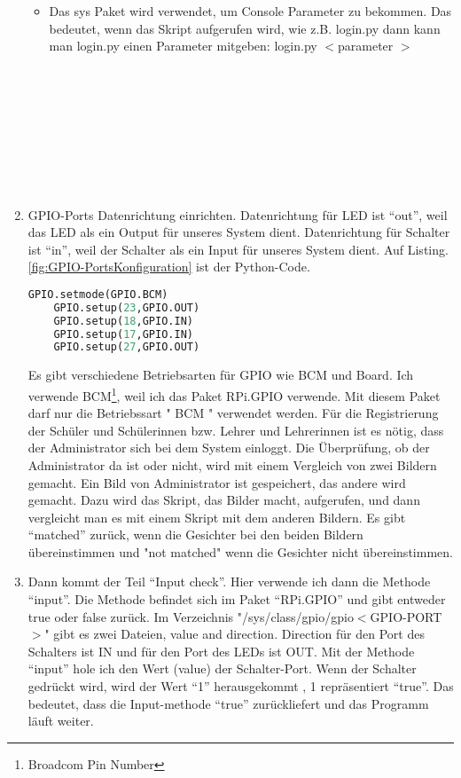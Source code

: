 \begin{enumerate}
\begin{itemize}
	 \item Das sys Paket wird verwendet, um Console Parameter zu bekommen. Das bedeutet, wenn das Skript aufgerufen wird, wie z.B. login.py dann kann man login.py einen Parameter mitgeben:  login.py $<$parameter $>$ \\ \\ \\ \\ \\ \\ \\ \\ \\ 
   \end{itemize}
	\item GPIO-Ports Datenrichtung einrichten. Datenrichtung f\"ur LED ist ``out'', weil das LED als ein Output f\"ur unseres System dient. Datenrichtung f\"ur Schalter ist ``in'', weil der Schalter als ein Input f\"ur unseres System dient. Auf Listing. \ref{fig:GPIO-PortsKonfiguration} ist der Python-Code.
	\begin{lstlisting}[caption={GPIO-Ports Konfiguration},label={fig:GPIO-PortsKonfiguration},language=Python]
	GPIO.setmode(GPIO.BCM)
	GPIO.setup(23,GPIO.OUT)
	GPIO.setup(18,GPIO.IN)
	GPIO.setup(17,GPIO.IN)
	GPIO.setup(27,GPIO.OUT)
	\end{lstlisting}
	Es gibt verschiedene Betriebsarten f\"ur GPIO wie BCM und Board.
	Ich verwende BCM\footnote{Broadcom Pin Number}, weil ich das Paket RPi.GPIO verwende. Mit diesem Paket darf nur die Betriebssart " BCM " verwendet werden. 
	\cite{gpiomode}
	F\"ur die Registrierung der Sch\"uler und Sch\"ulerinnen bzw. Lehrer und Lehrerinnen ist es n\"otig, dass der Administrator sich bei dem System einloggt. Die \"Uberpr\"ufung, ob der Administrator da ist oder nicht,  wird mit einem Vergleich von zwei Bildern gemacht. Ein Bild von Administrator ist gespeichert, das andere wird gemacht. Dazu wird das Skript, das Bilder macht, aufgerufen, und dann vergleicht man es mit einem Skript mit dem anderen Bildern. Es gibt ``matched'' zur\"uck, wenn die Gesichter bei den beiden Bildern \"ubereinstimmen und "not matched" wenn die Gesichter nicht \"ubereinstimmen.
	\item Dann kommt der Teil ``Input check''. 
	Hier verwende ich dann die Methode ``input''. Die Methode befindet sich im Paket ``RPi.GPIO'' und gibt entweder true oder false zur\"uck. 
	Im Verzeichnis "/sys/class/gpio/gpio$<$GPIO-PORT$>$" gibt es zwei Dateien, value and direction. Direction f\"ur den Port des Schalters ist IN und f\"ur den Port des LEDs ist OUT. Mit der Methode ``input'' hole ich den Wert (value) der Schalter-Port. Wenn der Schalter gedr\"uckt wird, wird der Wert ``1'' herausgekommt , 1 repr\"asentiert ``true''. Das bedeutet, dass die Input-methode ``true'' zur\"uckliefert und das Programm l\"auft weiter.
	

\end{enumerate}
